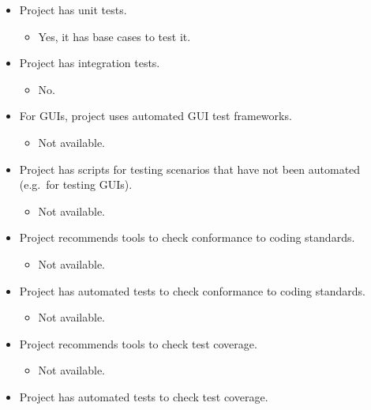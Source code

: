 \begin{itemize}
\itemsep1pt\parskip0pt
\item
  Project has unit tests.

  \begin{itemize}
  \itemsep1pt\parskip0pt
  \item
    Yes, it has base cases to test it.
  \end{itemize}
\item
  Project has integration tests.

  \begin{itemize}
  \itemsep1pt\parskip0pt
  \item
    No.
  \end{itemize}
\item
  For GUIs, project uses automated GUI test frameworks.

  \begin{itemize}
  \itemsep1pt\parskip0pt
  \item
    Not available.
  \end{itemize}
\item
  Project has scripts for testing scenarios that have not been automated
  (e.g.~for testing GUIs).

  \begin{itemize}
  \itemsep1pt\parskip0pt
  \item
    Not available.
  \end{itemize}
\item
  Project recommends tools to check conformance to coding standards.

  \begin{itemize}
  \itemsep1pt\parskip0pt
  \item
    Not available.
  \end{itemize}
\item
  Project has automated tests to check conformance to coding standards.

  \begin{itemize}
  \itemsep1pt\parskip0pt
  \item
    Not available.
  \end{itemize}
\item
  Project recommends tools to check test coverage.

  \begin{itemize}
  \itemsep1pt\parskip0pt
  \item
    Not available.
  \end{itemize}
\item
  Project has automated tests to check test coverage.


\end{itemize}
